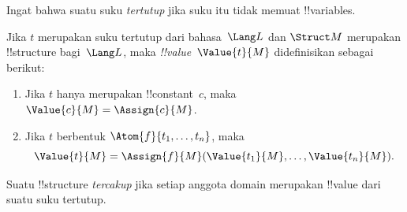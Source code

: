 \documentclass[../../../include/open-logic-section]{subfiles}
\begin{document}


\begin{explain}
Ingat bahwa suatu suku \emph{tertutup} jika suku itu tidak memuat
!!{variable}s.
\end{explain}

\begin{defn}
Jika $t$ merupakan suku tertutup dari bahasa~$\Lang L$ dan $\Struct M$
merupakan !!{structure} bagi~$\Lang L$, maka \emph{!!{value}}~$\Value{t}{M}$
didefinisikan sebagai berikut:
\begin{enumerate}
\item Jika $t$ hanya merupakan !!{constant}~$c$, maka $\Value{c}{M} = \Assign{c}{M}$.
\item Jika $t$ berbentuk $\Atom{f}{t_1, \ldots, t_n}$, maka
  \[
  \Value{t}{M} = \Assign{f}{M}(\Value{t_1}{M}, \ldots,
  \Value{t_n}{M}).
  \]
\end{enumerate}
\end{defn}

\begin{defn}
Suatu !!{structure} \emph{tercakup} jika setiap anggota domain merupakan
!!{value} dari suatu suku tertutup.
\end{defn}
\end{document}
